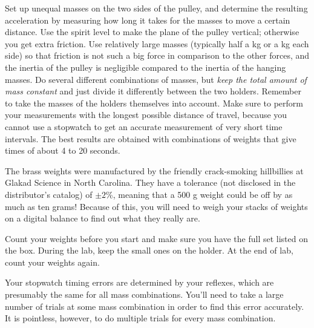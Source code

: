 \label{lab:atwood}

\apparatus
{}


\observations


Set up unequal masses on the two sides of the pulley, and
determine the resulting acceleration by measuring how long
it takes for the masses to move a certain distance. 
Use the spirit level to make the plane of the pulley vertical; otherwise you
get extra friction.
Use relatively large
masses (typically half a kg or a kg each side) so that friction
is not such a big force in comparison to the other forces, and
the inertia of the pulley is negligible compared to the inertia
of the hanging masses.
Do several different combinations of masses, but \emph{keep
the total amount of mass constant} and just divide it
differently between the two holders.  Remember to take the
masses of the holders themselves into account. Make sure to
perform your measurements with the longest possible distance
of travel, because you cannot use a stopwatch to get an
accurate measurement of very short time intervals. The best
results are obtained with combinations of weights that give
times of about 4 to 20 seconds.

The brass weights were manufactured by the friendly crack-smoking
hillbillies at Glakad Science in North Carolina. They have a tolerance (not
disclosed in the distributor's catalog) of $\pm 2$\%, meaning
that a 500 g weight could be off by as much as ten grams!
Because of this, you will need to weigh your stacks of weights on
a digital balance to find out what they really are.

Count your weights before you start and make sure you have the full
set listed on the box. During the lab, keep the small ones on the holder.
At the end of lab, count your weights again.

Your stopwatch timing errors are determined by your reflexes, which
are presumably the same for all mass combinations. You'll need to take a large
number of trials at some mass combination in order to find this error accurately.
It is pointless, however, to do multiple trials for every mass combination.


